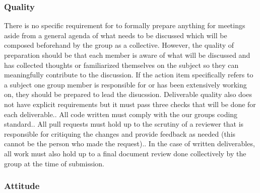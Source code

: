\documentclass{article}
\begin{document}
\subsubsection*{Quality} 


\par{There is no specific requirement for to formally prepare anything for meetings aside from a general agenda of what needs to be discussed which will be
composed beforehand by the group as a collective. However, the quality of preparation should be that each member is aware of what will be discussed and 
has collected thoughts or familiarized themselves on the subject so they can meaningfully contribute to the discussion. If the action item specifically 
refers to a subject one group member is responsible for or has been extensively working on, they should be prepared to lead the disucssion. \newline\newline\indent
Deliverable quality also does not have explicit requirements but it must pass three checks that will be done for each deliverable.\newline{}. All code written must comply with the our groups coding standard.. All pull requests must hold up to the scrutiny of a reviewer that is responsible for critiquing the changes and provide feedback as needed (this cannot be the person who made the request).. In the case of written deliverables, all work must also hold up to a final document review done collectively by the group at the time of submission.}  

\subsubsection*{Attitude}

\end{document}
